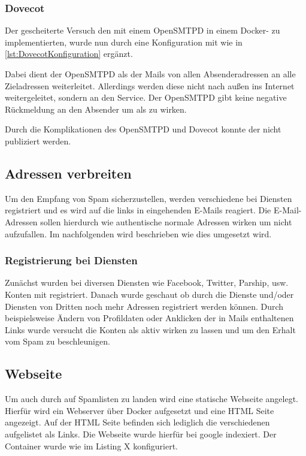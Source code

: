 \documentclass[a4paper,11pt,singlespacing]{article}
\begin{document}
		\subsubsection{Dovecot}\label{OpenRelayDovecot}
			Der gescheiterte Versuch den  mit einem \textsf{OpenSMTPD} in einem Docker- zu implementierten, wurde nun durch eine Konfiguration mit  wie in \autoref{lst:DovecotKonfiguration} ergänzt.

			Dabei dient der \textsf{OpenSMTPD} als  der Mails von allen Absenderadressen an alle Zieladressen weiterleitet.
			Allerdings werden diese nicht nach au{\ss}en ins Internet weitergeleitet, sondern an den  Service.
			Der \textsf{OpenSMTPD} gibt keine negative Rückmeldung an den Absender um als  zu wirken.

			Durch die Komplikationen des \textsf{OpenSMTPD} und \textsf{Dovecot} konnte der  nicht publiziert werden.

		\subsection{Adressen verbreiten}\label{sec:UmsetzungAdressenverbreiten}
			Um den Empfang von Spam sicherzustellen, werden verschiedene  bei Diensten registriert und es wird auf die links in eingehenden E-Mails reagiert.
			Die E-Mail-Adressen sollen hierdurch wie authentische normale Adressen wirken um nicht aufzufallen.
			Im nachfolgenden wird beschrieben wie dies umgesetzt wird.

		\subsubsection{Registrierung bei Diensten}\label{AdressenVerbreitenRegistrierenDiensten}
			Zunächst wurden bei diversen Diensten wie Facebook, Twitter, Parship, usw. Konten mit  registriert.
			Danach wurde geschaut ob durch die Dienste und/oder Diensten von Dritten noch mehr Adressen registriert werden können.
			Durch beispielsweise Ändern von Profildaten oder Anklicken der in Mails enthaltenen Links wurde versucht die Konten als aktiv wirken zu lassen und um den Erhalt vom Spam zu beschleunigen.

	\subsection{Webseite}\label{sec:UmsetzungWebsite}
		Um auch durch  auf Spamlisten zu landen wird eine statische Webseite angelegt.
		Hierfür wird ein Webserver über Docker aufgesetzt und eine HTML Seite angezeigt.
		Auf der HTML Seite befinden sich lediglich die verschiedenen  aufgelistet als Links.
		Die Webseite wurde hierfür bei google indexiert.
		Der Container wurde wie im Listing X konfiguriert.
\end{document}
